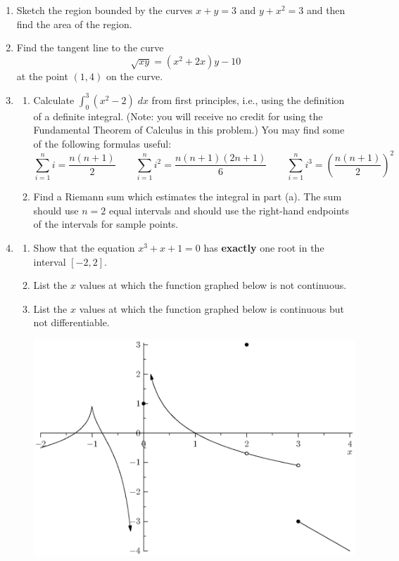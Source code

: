 \documentclass[12pt]{article}
\newcommand{\ds}{\displaystyle}
\begin{document}
\begin{enumerate}
\begin{enumerate}
\vfill
  \end{enumerate}
\newpage
\item Sketch 
  the region bounded by the curves $x+y=3$ and $y+x^2=3$ and then
  find the area of the region.
\vfill
\newpage
\item Find 
  the tangent line to the curve
  \begin{displaymath}
    \sqrt{xy} = (x^2+2x)y - 10
  \end{displaymath}
  at the point $(1,4)$ on the curve.
\vfill
\newpage
\item 
  \begin{enumerate}
  \item Calculate 
    $\ds\int^3_0 (x^2-2) \; dx$ from first principles, i.e., using
    the definition of a definite integral.
    (Note: you will receive no credit for 
    using the Fundamental Theorem of Calculus in this problem.)
    You may find some of the following formulas useful:
    \begin{displaymath}
      \sum_{i=1}^n i = \frac{n(n+1)}{2}
      \qquad
      \sum_{i=1}^n i^2 = \frac{n(n+1)(2n+1)}{6}
      \qquad
      \sum_{i=1}^n i^3 = \left(\frac{n(n+1)}{2}\right)^2
    \end{displaymath}
  \item Find a Riemann sum which estimates the integral in part (a).
    The sum should use $n=2$ equal intervals and should 
    use the right-hand endpoints of the intervals for sample points.
\vfill
  \end{enumerate}
\newpage
\item
  \begin{enumerate}
  \item Show
    that the equation $x^3+x+1 = 0$ has 
    \textbf{exactly} 
    one root in the interval $[-2,2]$.
\vfill
\vfill
\vfill
\vfill
  \item List the $x$ values at which the function graphed below 
    is not continuous.
\vfill
  \item List the $x$ values at which the function graphed below
    is continuous but not differentiable.
\vfill
    \begin{center}
      \includegraphics[width=6in]{cont.eps}

\end{center}
\end{enumerate}
\end{enumerate}
\end{document}
